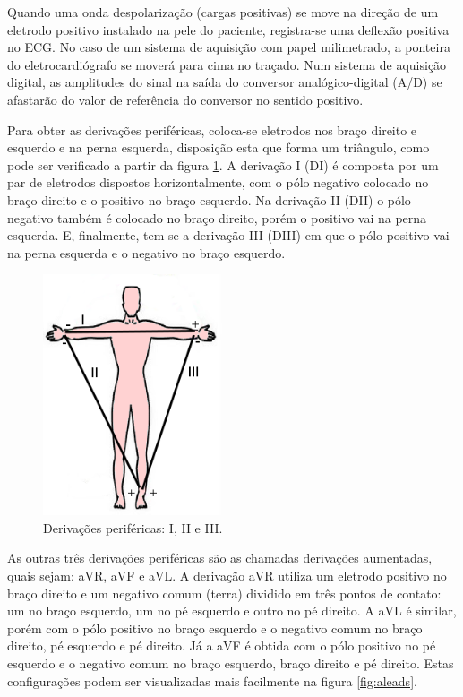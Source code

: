 Quando uma onda despolarização (cargas positivas) se move na direção de um eletrodo positivo instalado na pele do paciente, registra-se uma deflexão positiva no ECG. No caso de um sistema de aquisição com papel milimetrado, a ponteira do eletrocardiógrafo se moverá para cima no traçado. Num sistema de aquisição digital, as amplitudes do sinal na saída do conversor analógico-digital (A/D) se afastarão do valor de referência do conversor no sentido positivo.

Para obter as derivações periféricas, coloca-se eletrodos nos braço direito e esquerdo e na perna esquerda, disposição esta que forma um triângulo, como pode ser verificado a partir da figura \ref{fig:mleads}. A derivação I (DI) é composta por um par de eletrodos dispostos horizontalmente, com o pólo negativo colocado no braço direito e o positivo no braço esquerdo. Na derivação II (DII) o pólo negativo também é colocado no braço direito, porém o positivo vai na perna esquerda. E, finalmente, tem-se a derivação III (DIII) em que o pólo positivo vai na perna esquerda e o negativo no braço esquerdo.

\begin{figure}[ht!]
    \centering
    \includegraphics[width=150pt]{figures/chap2-mleads.png}
    \caption[Derivações periféricas: I, II e III]{Derivações periféricas: I, II e III.}
    \label{fig:mleads}
\end{figure}

As outras três derivações periféricas são as chamadas derivações aumentadas, quais sejam: aVR, aVF e aVL. A derivação aVR utiliza um eletrodo positivo no braço direito e um negativo comum (terra) dividido em três pontos de contato: um no braço esquerdo, um no pé esquerdo e outro no pé direito. A aVL é similar, porém com o pólo positivo no braço esquerdo e o negativo comum no braço direito, pé esquerdo e pé direito. Já a aVF é obtida com o pólo positivo no pé esquerdo e o negativo comum no braço esquerdo, braço direito e pé direito. Estas configurações podem ser visualizadas mais facilmente na figura \ref{fig:aleads}.


